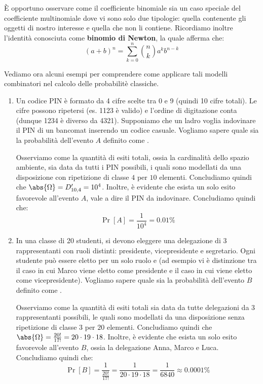 \documentclass[a4paper, 12pt]{report}
\begin{document}
    È opportuno osservare come il coefficiente binomiale sia un caso speciale del coefficiente multinomiale dove vi sono solo due tipologie: quella contenente gli oggetti di nostro interesse e quella che non li contiene. 
    Ricordiamo inoltre l'identità conosciuta come \textbf{binomio di Newton}, la quale afferma che:
    \[(a+b)^n = \sum_{k = 0}^n \binom{n}{k} a^k b^{n-k}\]
    
    Vediamo ora alcuni esempi per comprendere come applicare tali modelli combinatori nel calcolo delle probabilitè classiche.
    \begin{enumerate}
        \item Un codice PIN è formato da 4 cifre scelte tra 0 e 9 (quindi 10 cifre totali). Le cifre possono ripetersi (es. 1123 è valido) e l'ordine di digitazione conta (dunque 1234 è diverso da 4321). Supponiamo che un ladro voglia indovinare il PIN di un bancomat inserendo un codice casuale. Vogliamo sapere quale sia la probabilità dell'evento $A$ definito come .
        
        Osserviamo come la quantità di esiti totali, ossia la cardinalità dello spazio ambiente, sia data da tutti i PIN possibili, i quali sono modellati da una disposizione con ripetizione di classe $4$ per $10$ elementi. Concludiamo quindi che $\abs{\Omega} = D'_{10,4} = 10^4$. Inoltre, è evidente che esista un solo esito favorevole all'evento $A$, vale a dire il PIN da indovinare. Concludiamo quindi che:
        \[\Pr[A] = \frac{1}{10^4} = 0.01\%\] 

        \item In una classe di 20 studenti, si devono eleggere una delegazione di 3 rappresentanti con ruoli distinti: presidente, vicepresidente e segretario. Ogni studente può essere eletto per un solo ruolo e  (ad esempio vi è distinzione tra il caso in cui Marco viene eletto come presidente e il caso in cui viene eletto come vicepresidente). Vogliamo sapere quale sia la probabilità dell'evento $B$ definito come .
        
        Osserviamo come la quantità di esiti totali sia data da tutte delegazioni da 3 rappresentanti possibili, le quali sono modellati da una disposizione senza ripetizione di classe $3$ per $20$ elementi. Concludiamo quindi che $\abs{\Omega} = \frac{20!}{17!} = 20 \cdot 19 \cdot 18$. Inoltre, è evidente che esista un solo esito favorevole all'evento $B$, ossia la delegazione Anna, Marco e Luca. Concludiamo quindi che:
        \[\Pr[B] = \frac{1}{\frac{20!}{17!}} = \frac{1}{20 \cdot 19 \cdot 18} = \frac{1}{6840} \approx 0.0001\%\] 



\end{enumerate}
\end{document}
